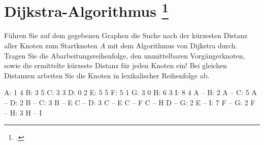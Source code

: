 \documentclass{bschlangaul-aufgabe}
\begin{document}

\section{Dijkstra-Algorithmus
\footcite[Aufgabe 4]{aud:e-klausur}
}

Führen Sie auf dem gegebenen Graphen die Suche nach der kürzesten
Distanz aller Knoten zum Startknoten $A$ mit dem Algorithmus von
Dijkstra durch. Tragen Sie die Abarbeitungsreihenfolge, den
unmittelbaren Vorgängerknoten, sowie die ermittelte kürzeste Distanz für
jeden Knoten ein! Bei gleichen Distanzen arbeiten Sie die Knoten in
lexikalischer Reihenfolge ab.

\begin{bGraphenFormat}
A: 1 4
B: 3 5
C: 3 3
D: 0 2
E: 5 5
F: 5 1
G: 3 0
H: 6 3
I: 8 4
A -- B: 2
A -- C: 5
A -- D: 2
B -- C: 3
B -- E
C -- D: 3
C -- E
C -- F
C -- H
D -- G: 2
E -- I: 7
F -- G: 2
F -- H: 3
H -- I
\end{bGraphenFormat}

\begin{center}
\end{center}
\end{document}
